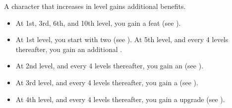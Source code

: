     A character that increases in level gains additional benefits.
    \begin{itemize}
        \item At 1st, 3rd, 6th, and 10th level, you gain a feat (see ).
        \item At 1st level, you start with two  (see ). At 5th level, and every 4 levels thereafter, you gain an additional .
        \item At 2nd level, and every 4 levels thereafter, you gain an  (see ).
        \item At 3rd level, and every 4 levels thereafter, you gain a  (see ).
        \item At 4th level, and every 4 levels thereafter, you gain a  upgrade (see ).
    \end{itemize}

